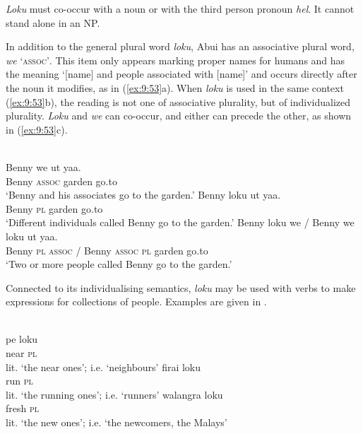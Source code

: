 \textit{Loku} must co-occur with a noun or with the third person pronoun \textit{hel}. It cannot stand alone in an NP.

In addition to the general plural word \textit{loku}, Abui has an associative plural word, \textit{we} `\textsc{assoc'}. This item only appears marking proper names for humans and has the meaning `[name] and people associated with [name]' and occurs directly after the noun it modifies, as in (\ref{ex:9:53}a). When \textit{loku} is used in the same context (\ref{ex:9:53}b), the reading is not one of associative plurality, but of individualized plurality. \textit{Loku} and \textit{we} can co-occur, and either can precede the other, as shown in (\ref{ex:9:53}c).




\ea%
\label{ex:9:53}
\ea
{} \\
\gll Benny w{e} ut yaa. \\
   Benny \textsc{assoc} garden go.to  \\
\glt `Benny and his associates go to the garden.'
\ex
\gll Benny loku ut yaa. \\
   Benny \textsc{pl} garden go.to  \\
\glt `Different individuals called Benny go to the garden.'
\ex
\gll Benny loku we / Benny  we loku ut yaa.\\
    Benny \textsc{pl}  \textsc{assoc} / Benny \textsc{assoc} \textsc{pl} garden go.to\\
\glt  `Two or more people called Benny go to the garden.'
\z
\z






Connected to its individualising semantics, \textit{loku} may be used with verbs to make expressions for collections of people. Examples are given in .


\ea%
\label{ex:9:54}
\ea
{} \\
\gll pe loku  \\
   near \textsc{pl}  \\
\glt lit. `the near ones'; i.e. `neighbours'
\ex
\gll firai loku \\
  run \textsc{pl}   \\
 \glt lit. `the running ones'; i.e. `runners'
\glt
\ex
\gll walangra loku \\
   fresh \textsc{pl}  \\
\glt  lit. `the new ones'; i.e. `the newcomers, the Malays'
\z
\z






